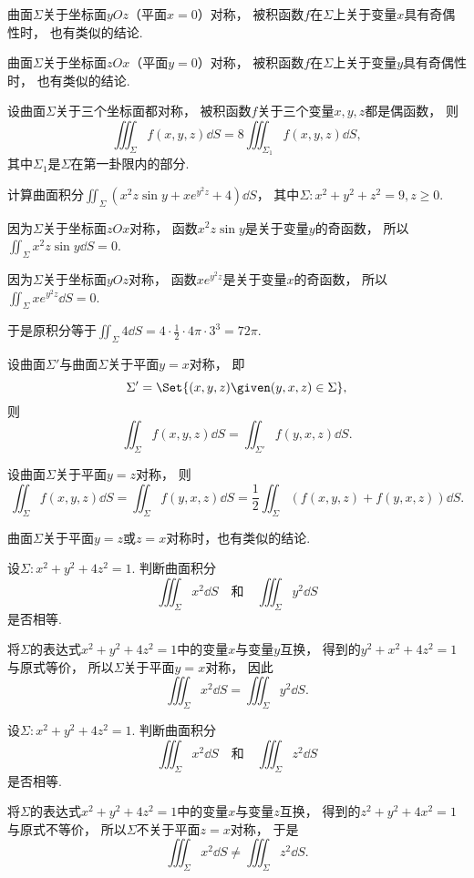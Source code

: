 曲面\(\Sigma\)关于坐标面\(yOz\)（平面\(x=0\)）对称，
被积函数\(f\)在\(\Sigma\)上关于变量\(x\)具有奇偶性时，
也有类似的结论.

曲面\(\Sigma\)关于坐标面\(zOx\)（平面\(y=0\)）对称，
被积函数\(f\)在\(\Sigma\)上关于变量\(y\)具有奇偶性时，
也有类似的结论.

设曲面\(\Sigma\)关于三个坐标面都对称，
被积函数\(f\)关于三个变量\(x,y,z\)都是偶函数，
则\[
	\iiint_\Sigma f(x,y,z) \dd{S}
	= 8 \iiint_{\Sigma_1} f(x,y,z) \dd{S},
\]
其中\(\Sigma_1\)是\(\Sigma\)在第一卦限内的部分.

\begin{example}
计算曲面积分\(\iint_\Sigma (x^2 z \sin y + x e^{y^2 z} + 4) \dd{S}\)，
其中\(\Sigma: x^2+y^2+z^2=9, z\geq0\).
\begin{solution}
因为\(\Sigma\)关于坐标面\(zOx\)对称，
函数\(x^2 z \sin y\)是关于变量\(y\)的奇函数，
所以\(\iint_\Sigma x^2 z \sin y \dd{S} = 0\).

因为\(\Sigma\)关于坐标面\(yOz\)对称，
函数\(x e^{y^2 z}\)是关于变量\(x\)的奇函数，
所以\(\iint_\Sigma x e^{y^2 z} \dd{S} = 0\).

于是原积分等于\(\iint_\Sigma 4 \dd{S} = 4\cdot\frac12\cdot4\pi\cdot3^3 = 72\pi\).
\end{solution}
\end{example}

设曲面\(\Sigma'\)与曲面\(\Sigma\)关于平面\(y=x\)对称，
即\[
	\Sigma' = \Set{ (x,y,z) \given (y,x,z) \in \Sigma },
\]
则\[
	\iint_\Sigma f(x,y,z) \dd{S}
	= \iint_{\Sigma'} f(y,x,z) \dd{S}.
\]

设曲面\(\Sigma\)关于平面\(y=z\)对称，
则\[
	\iint_\Sigma f(x,y,z) \dd{S}
	= \iint_\Sigma f(y,x,z) \dd{S}
	= \frac12 \iint_\Sigma (f(x,y,z) + f(y,x,z)) \dd{S}.
\]

曲面\(\Sigma\)关于平面\(y=z\)或\(z=x\)对称时，也有类似的结论.

\begin{example}
设\(\Sigma: x^2+y^2+4z^2=1\).
判断曲面积分\[
	\iiint_\Sigma x^2 \dd{S}
	\quad\text{和}\quad
	\iiint_\Sigma y^2 \dd{S}
\]是否相等.
\begin{solution}
将\(\Sigma\)的表达式\(x^2+y^2+4z^2=1\)中的变量\(x\)与变量\(y\)互换，
得到的\(y^2+x^2+4z^2=1\)与原式等价，
所以\(\Sigma\)关于平面\(y=x\)对称，
因此\[
	\iiint_\Sigma x^2 \dd{S}
	= \iiint_\Sigma y^2 \dd{S}.
\]
\end{solution}
\end{example}

\begin{example}
设\(\Sigma: x^2+y^2+4z^2=1\).
判断曲面积分\[
	\iiint_\Sigma x^2 \dd{S}
	\quad\text{和}\quad
	\iiint_\Sigma z^2 \dd{S}
\]是否相等.
\begin{solution}
将\(\Sigma\)的表达式\(x^2+y^2+4z^2=1\)中的变量\(x\)与变量\(z\)互换，
得到的\(z^2+y^2+4x^2=1\)与原式不等价，
所以\(\Sigma\)不关于平面\(z=x\)对称，
于是\[
	\iiint_\Sigma x^2 \dd{S}
	\neq \iiint_\Sigma z^2 \dd{S}.
\]
\end{solution}
\end{example}

